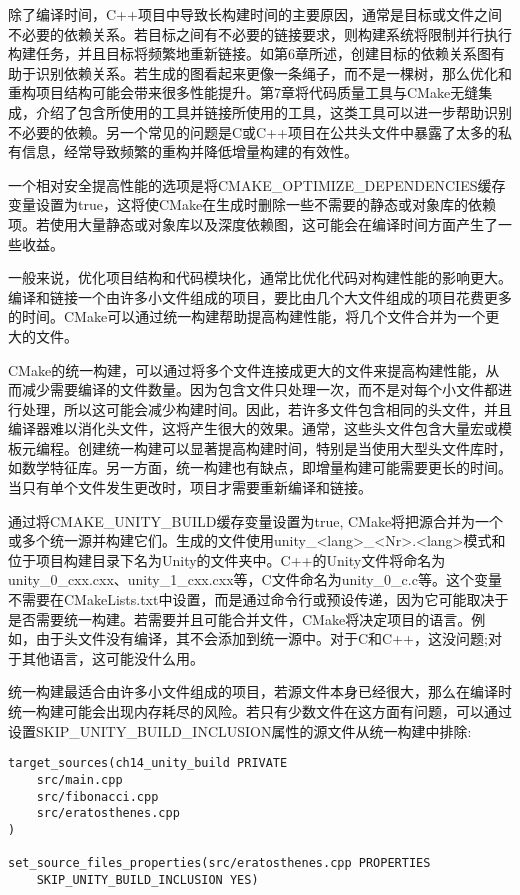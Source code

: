 
除了编译时间，C++项目中导致长构建时间的主要原因，通常是目标或文件之间不必要的依赖关系。若目标之间有不必要的链接要求，则构建系统将限制并行执行构建任务，并且目标将频繁地重新链接。如第6章所述，创建目标的依赖关系图有助于识别依赖关系。若生成的图看起来更像一条绳子，而不是一棵树，那么优化和重构项目结构可能会带来很多性能提升。第7章将代码质量工具与CMake无缝集成，介绍了包含所使用的工具并链接所使用的工具，这类工具可以进一步帮助识别不必要的依赖。另一个常见的问题是C或C++项目在公共头文件中暴露了太多的私有信息，经常导致频繁的重构并降低增量构建的有效性。

一个相对安全提高性能的选项是将CMAKE\_OPTIMIZE\_DEPENDENCIES缓存变量设置为true，这将使CMake在生成时删除一些不需要的静态或对象库的依赖项。若使用大量静态或对象库以及深度依赖图，这可能会在编译时间方面产生了一些收益。

一般来说，优化项目结构和代码模块化，通常比优化代码对构建性能的影响更大。编译和链接一个由许多小文件组成的项目，要比由几个大文件组成的项目花费更多的时间。CMake可以通过统一构建帮助提高构建性能，将几个文件合并为一个更大的文件。


CMake的统一构建，可以通过将多个文件连接成更大的文件来提高构建性能，从而减少需要编译的文件数量。因为包含文件只处理一次，而不是对每个小文件都进行处理，所以这可能会减少构建时间。因此，若许多文件包含相同的头文件，并且编译器难以消化头文件，这将产生很大的效果。通常，这些头文件包含大量宏或模板元编程。创建统一构建可以显著提高构建时间，特别是当使用大型头文件库时，如数学特征库。另一方面，统一构建也有缺点，即增量构建可能需要更长的时间。当只有单个文件发生更改时，项目才需要重新编译和链接。

通过将CMAKE\_UNITY\_BUILD缓存变量设置为true, CMake将把源合并为一个或多个统一源并构建它们。生成的文件使用unity\_<lang>\_<Nr>.<lang>模式和位于项目构建目录下名为Unity的文件夹中。C++的Unity文件将命名为unity\_0\_cxx.cxx、unity\_1\_cxx.cxx等，C文件命名为unity\_0\_c.c等。这个变量不需要在CMakeLists.txt中设置，而是通过命令行或预设传递，因为它可能取决于是否需要统一构建。若需要并且可能合并文件，CMake将决定项目的语言。例如，由于头文件没有编译，其不会添加到统一源中。对于C和C++，这没问题;对于其他语言，这可能没什么用。

统一构建最适合由许多小文件组成的项目，若源文件本身已经很大，那么在编译时统一构建可能会出现内存耗尽的风险。若只有少数文件在这方面有问题，可以通过设置SKIP\_UNITY\_BUILD\_INCLUSION属性的源文件从统一构建中排除:

\begin{lstlisting}[style=styleCMake]
target_sources(ch14_unity_build PRIVATE
	src/main.cpp
	src/fibonacci.cpp
	src/eratosthenes.cpp
)

set_source_files_properties(src/eratosthenes.cpp PROPERTIES
	SKIP_UNITY_BUILD_INCLUSION YES)
\end{lstlisting}

